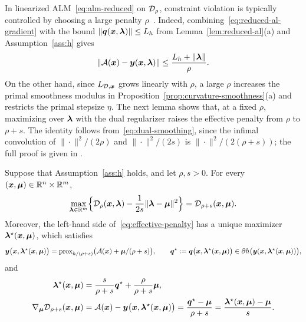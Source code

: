 In linearized ALM~\eqref{eq:alm-reduced} on \(\mathcal{D}_\rho\),
constraint violation is typically controlled by choosing a large penalty
\(\rho\)~\cite{luSingleLoopGradientDescent2022,sun2024dual_descent_alm_admm,elbourkhissi2025perturbed}.
Indeed, combining~\eqref{eq:reduced-al-gradient} with the bound
\(\|\bm{q}(\bm{x},\bm{\lambda})\|\le L_h\) from Lemma~\ref{lem:reduced-al}(a) and
Assumption~\ref{ass:h} gives
\[
    \|\mathcal{A}(\bm{x})-\bm{y}(\bm{x},\bm{\lambda})\|
    \le\frac{L_h+\|\bm{\lambda}\|}{\rho}.
\]
On the other hand, since \(L_{\mathcal{D},\bm{x}}\) grows linearly with \(\rho\),
a large \(\rho\) increases the primal smoothness modulus in
Proposition~\ref{prop:curvature-smoothness}(a) and restricts the primal stepsize
\(\eta\). The next lemma shows that,
at a fixed \(\rho\), maximizing over \(\bm{\lambda}\) with the dual regularizer
raises the effective penalty from \(\rho\) to \(\rho+s\). The identity
follows from~\eqref{eq:dual-smoothing}, since the infimal convolution of
\(\|\cdot\|^2/(2\rho)\) and \(\|\cdot\|^2/(2s)\) is
\(\|\cdot\|^2/(2(\rho+s))\); the full proof is given in
.

\begin{lemma}
\label{lem:effective-penalty}
Suppose that Assumption~\ref{ass:h} holds, and let \(\rho,s>0\). For every
\((\bm{x},\bm{\mu})\in\mathbb{R}^n\times\mathbb{R}^m\),
\begin{equation}
    \max_{\bm{\lambda}\in\mathbb{R}^m}\Bigl\{\mathcal{D}_\rho(\bm{x},\bm{\lambda})
    -\frac{1}{2s}\|\bm{\lambda}-\bm{\mu}\|^2\Bigr\}
    =\mathcal{D}_{\rho+s}(\bm{x},\bm{\mu}).
    \label{eq:effective-penalty}
\end{equation}
Moreover, the left-hand side of~\eqref{eq:effective-penalty} has a unique
maximizer \(\bm{\lambda}^\star(\bm{x},\bm{\mu})\), which satisfies
\[
    \bm{y}\bigl(\bm{x},\bm{\lambda}^\star(\bm{x},\bm{\mu})\bigr)
    =\mathrm{prox}_{h/(\rho+s)}\bigl(\mathcal{A}(\bm{x})+\bm{\mu}/(\rho+s)\bigr),
    \qquad
    \bm{q}^\star:=\bm{q}\bigl(\bm{x},\bm{\lambda}^\star(\bm{x},\bm{\mu})\bigr)
    \in\partial h\bigl(\bm{y}(\bm{x},\bm{\lambda}^\star(\bm{x},\bm{\mu}))\bigr),
\]
and
\begin{equation}
\begin{aligned}
    \bm{\lambda}^\star(\bm{x},\bm{\mu})
    &=\frac{s}{\rho+s}\bm{q}^\star+\frac{\rho}{\rho+s}\bm{\mu},\\
    \nabla_{\bm{\mu}}\mathcal{D}_{\rho+s}(\bm{x},\bm{\mu})
    &=\mathcal{A}(\bm{x})-\bm{y}\bigl(\bm{x},\bm{\lambda}^\star(\bm{x},\bm{\mu})\bigr)
    =\frac{\bm{q}^\star-\bm{\mu}}{\rho+s}
    =\frac{\bm{\lambda}^\star(\bm{x},\bm{\mu})-\bm{\mu}}{s}.
\end{aligned}
    \label{eq:effective-penalty-maximizer}
\end{equation}
\end{lemma}

